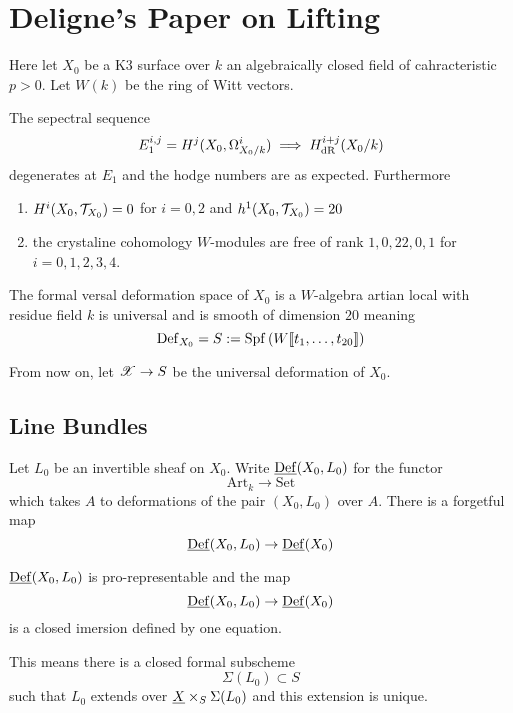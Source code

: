 \documentclass[12pt]{article}
\newcommand{\Def}{\mathrm{Def}}
\newcommand{\Spf}[1]{\mathrm{Spf}\left( #1 \right)}
\newcommand{\Art}{\mathrm{Art}}
\newcommand{\Set}{\mathrm{Set}}
\begin{document}
\section{Deligne's Paper on Lifting}

Here let $X_0$ be a K3 surface over $k$ an algebraically closed field of cahracteristic $p > 0$. Let $W(k)$ be the ring of Witt vectors.

\begin{prop}
The sepectral sequence
\[ E_1^{i,j} = H^j(X_0, \Omega^i_{X_0/k}) \implies H_{\mathrm{dR}}^{i+j}(X_0/k) \]
degenerates at $E_1$ and the hodge numbers are as expected. Furthermore
\begin{enumerate}
\item $H^i(X_0, \mathcal{T}_{X_0}) = 0$ for $i = 0,2$ and $h^1(X_0, \mathcal{T}_{X_0}) = 20$
\item the crystaline cohomology $W$-modules are free of rank $1,0,22,0,1$ for $i = 0,1,2,3,4$.
\end{enumerate}
\end{prop}

\begin{cor}
The formal versal deformation space of $X_0$ is a $W$-algebra artian local with residue field $k$ is universal and is smooth of dimension $20$ meaning
\[ \Def_{X_0} = S := \Spf{W \dbrac{t_1, \dots, t_{20}}} \]
\end{cor}

From now on, let $\mathscr{X} \to S$ be the universal deformation of $X_0$.

\subsection{Line Bundles}

Let $L_0$ be an invertible sheaf on $X_0$. Write $\ul{\Def}(X_0, L_0)$ for the functor
\[ \Art_k \to \Set \]
which takes $A$ to deformations of the pair $(X_0, L_0)$ over $A$. There is a forgetful map
\[ \ul{\Def}(X_0, L_0) \to \ul{\Def}(X_0) \]

\begin{prop}
$\ul{\Def}(X_0, L_0)$ is pro-representable and the map
\[ \ul{\Def}(X_0, L_0) \to \ul{\Def}(X_0) \]
is a closed imersion defined by one equation.
\end{prop} 

This means there is a closed formal subscheme
\[ \Sigma(L_0) \subset S \]
such that $L_0$ extends over $\underline{X} \times_S \Sigma(L_0)$ and this extension is unique.
\end{document}
